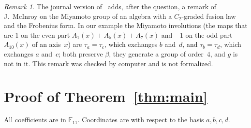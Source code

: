 \documentclass[11pt]{article}
\theoremstyle{remark}
\newtheorem{remark}{Remark}
\newcommand{\F}{\mathbb{F}}
\begin{document}
\begin{remark}
The journal version of~\cite{gs} adds, after the question, a remark of
J.~McInroy on the Miyamoto group of an algebra with a $C_2$-graded fusion law
and the Frobenius form. In our example the Miyamoto involutions
(the maps that are $1$ on the even part $A_1(x)+A_5(x)+A_7(x)$ and $-1$ on the
odd part $A_{10}(x)$ of an axis~$x$) are $\tau_a=\tau_c$, which exchanges $b$
and~$d$, and $\tau_b=\tau_d$, which exchanges $a$ and~$c$; both preserve
$\beta$, they generate a group of order~$4$, and $g$ is not in it. This remark
was checked by computer and is not formalized.
\end{remark}

\section{Proof of Theorem~\ref{thm:main}}\label{sec:proof}

All coefficients are in $\F_{11}$. Coordinates are with respect to the basis
$a,b,c,d$.
\end{document}
